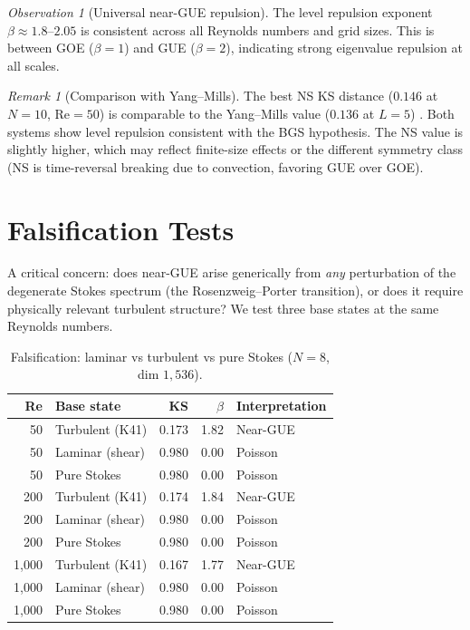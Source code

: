 \documentclass[11pt,a4paper]{article}
\theoremstyle{plain}
\theoremstyle{definition}
\theoremstyle{remark}
\newtheorem{remark}[theorem]{Remark}
\newtheorem{observation}[theorem]{Observation}
\begin{document}
\begin{observation}[Universal near-GUE repulsion]\label{obs:universal}
The level repulsion exponent $\beta \approx 1.8$--$2.05$ is consistent across all Reynolds numbers and grid sizes. This is between GOE ($\beta = 1$) and GUE ($\beta = 2$), indicating strong eigenvalue repulsion at all scales.
\end{observation}

\begin{remark}[Comparison with Yang--Mills]
The best NS KS distance ($0.146$ at $N = 10$, $\text{Re} = 50$) is comparable to the Yang--Mills value ($0.136$ at $L = 5$) \cite{DWR_YM2026}. Both systems show level repulsion consistent with the BGS hypothesis. The NS value is slightly higher, which may reflect finite-size effects or the different symmetry class (NS is time-reversal breaking due to convection, favoring GUE over GOE).
\end{remark}

\section{Falsification Tests}

A critical concern: does near-GUE arise generically from \emph{any} perturbation of the degenerate Stokes spectrum (the Rosenzweig--Porter transition), or does it require physically relevant turbulent structure? We test three base states at the same Reynolds numbers.

\begin{table}[H]
\centering
\caption{Falsification: laminar vs turbulent vs pure Stokes ($N = 8$, dim $1{,}536$).}
\begin{tabular}{rlrrl}
\toprule
Re & Base state & KS & $\beta$ & Interpretation \\
\midrule
50 & Turbulent (K41) & 0.173 & 1.82 & Near-GUE \\
50 & Laminar (shear) & 0.980 & 0.00 & Poisson \\
50 & Pure Stokes & 0.980 & 0.00 & Poisson \\
\midrule
200 & Turbulent (K41) & 0.174 & 1.84 & Near-GUE \\
200 & Laminar (shear) & 0.980 & 0.00 & Poisson \\
200 & Pure Stokes & 0.980 & 0.00 & Poisson \\
\midrule
1{,}000 & Turbulent (K41) & 0.167 & 1.77 & Near-GUE \\
1{,}000 & Laminar (shear) & 0.980 & 0.00 & Poisson \\
1{,}000 & Pure Stokes & 0.980 & 0.00 & Poisson \\
\bottomrule
\end{tabular}
\end{table}
\end{document}
